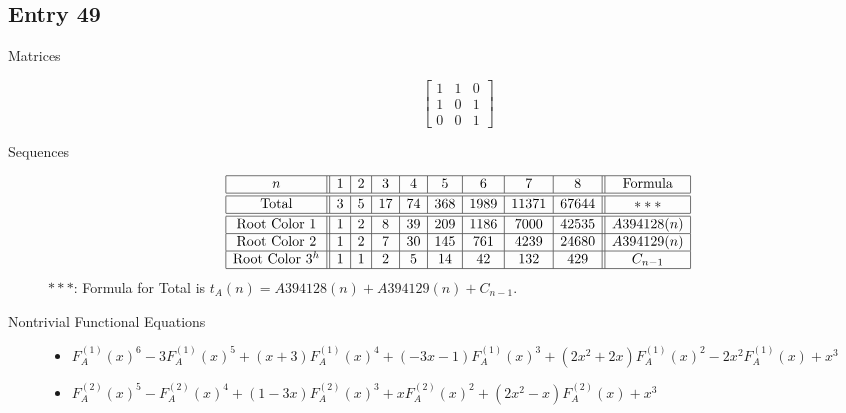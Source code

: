 \documentclass[12pt]{amsart}
\newcommand{\gff}[2]{F_{#2}^{(#1)}(x)}
\newcommand{\gfa}[1]{\gff{#1}{A}}
\begin{document}
\subsection*{Entry 49}
\begin{description}
    \item[Matrices]
    
    \[\begin{bmatrix}
1 & 1 & 0 \\
1 & 0 & 1 \\
0 & 0 & 1
\end{bmatrix}\]
    \item[Sequences]\hspace*{\fill}\vspace{-0.5cm}
    \begin{center}
        \[
        \begin{array}{|c||c|c|c|c|c|c|c|c||c|}\hline
           n  & 1 & 2 & 3 & 4 & 5 & 6 & 7 & 8  & \text{Formula}\\\hline\hline
           \text{Total}  & 3 & 5 & 17 & 74 & 368 & 1989 & 11371 & 67644 & ***\\\hline\hline
           \text{Root Color }1 & 1 & 2 & 8 & 39 & 209 & 1186 & 7000 & 42535 & A394128(n) \\\hline
           \text{Root Color }2 & 1 & 2 & 7 & 30 & 145 & 761 & 4239 & 24680 & A394129(n) \\\hline
           \text{Root Color }3^{h} & 1 & 1 & 2 & 5 & 14 & 42 & 132 & 429 & C_{n-1}\\\hline
        \end{array}
        \]
        $***$: Formula for Total is $t_A(n)=A394128(n)+A394129(n)+C_{n-1}$.
    \end{center}
    
    \item[Nontrivial Functional Equations]\hspace*{\fill}

    \begin{itemize}
\item $\gfa{1}^6-3\gfa{1}^5+(x + 3)\gfa{1}^4+(-3x - 1)\gfa{1}^3+(2x^2 + 2x)\gfa{1}^2-2x^2\gfa{1}+x^3$


\item $\gfa{2}^5-\gfa{2}^4+(1 - 3x)\gfa{2}^3+x\gfa{2}^2+(2x^2 - x)\gfa{2}+x^3$


\end{itemize}
    
\end{description}
\end{document}
